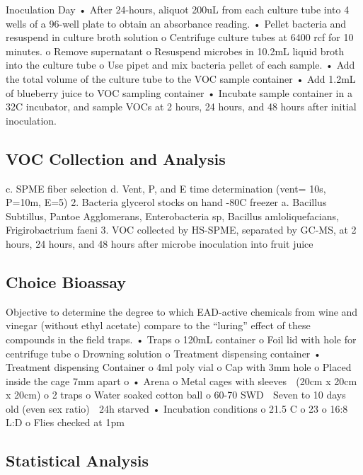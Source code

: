 \documentclass[review]{elsarticle}
\begin{document}
\begin{Materials and Methods}
Inoculation Day
•	After 24-hours, aliquot 200uL from each culture tube into 4 wells of a 96-well plate to obtain an absorbance reading.
•	Pellet bacteria and resuspend in culture broth solution
o	Centrifuge culture tubes at 6400 rcf for 10 minutes.
o	Remove supernatant
o	 Resuspend microbes in 10.2mL liquid broth into the culture tube
o	Use pipet and mix bacteria pellet of each sample. 
•	Add the total volume of the culture tube to the VOC sample container
•	Add 1.2mL of blueberry juice to VOC sampling container
•	Incubate sample container in a 32C incubator, and sample VOCs at 2 hours, 24 hours, and 48 hours after initial inoculation.

\subsection{VOC Collection and Analysis}
c.	SPME fiber selection
d.	Vent, P, and E time determination (vent= 10s, P=10m, E=5)
2.	Bacteria glycerol stocks on hand -80C freezer
a.	Bacillus Subtillus, Pantoe Agglomerans, Enterobacteria sp, Bacillus amloliquefacians, Frigirobactrium faeni
3.	VOC collected by HS-SPME, separated by GC-MS, at 2 hours, 24 hours, and 48 hours after microbe inoculation into fruit juice

\subsection{Choice Bioassay}
Objective to determine the degree to which EAD-active chemicals from wine and vinegar (without ethyl acetate) compare to the “luring” effect of these compounds in the field traps.
•	Traps
o	120mL container
o	Foil lid with hole for centrifuge tube
o	Drowning solution
o	Treatment dispensing container
•	Treatment dispensing Container
o	4ml poly vial
o	Cap with 3mm hole
o	Placed inside the cage 7mm apart 
o	
•	Arena
o	Metal cages with sleeves
	(20cm x 20cm x 20cm)
o	2 traps
o	Water soaked cotton ball
o	60-70 SWD
	Seven to 10 days old (even sex ratio)
	24h starved
•	Incubation conditions
o	21.5 C
o	23%
o	16:8 L:D
o	Flies checked at 1pm

\subsection{Statistical Analysis}
\end{Materials and Methods}
\end{document}
